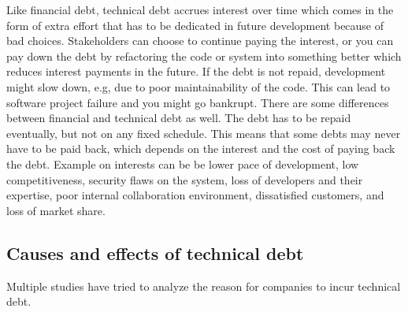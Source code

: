 Like financial debt, technical debt accrues interest over time which comes in the form of extra effort that has to be dedicated in future development because of bad choices\cite{p31-guo,p35-klinger}. Stakeholders can choose to continue paying the interest, or you can pay down the debt by refactoring the code or system into something better which reduces interest payments in the future\cite{url-fowler}. If the debt is not repaid, development might slow down, e.g, due to poor maintainability of the code. This can lead to software project failure and you might go bankrupt\cite{p50-allman}. There are some differences between financial and technical debt as well. The debt has to be repaid eventually, but not on any fixed schedule\cite{p50-allman}. This means that some debts may never have to be paid back, which depends on the interest and the cost of paying back the debt\cite{foser076-brown}. Example on interests can be be lower pace of development, low competitiveness, security flaws on the system, loss of developers and their expertise, poor internal collaboration environment, dissatisfied customers, and loss of market share\cite{p50-allman}.


\subsection{Causes and effects of technical debt}
Multiple studies have tried to analyze the reason for companies to incur technical debt.

